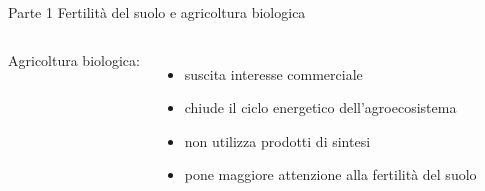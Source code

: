 \documentclass[10pt]{beamer}
\begin{document}
\begin{frame}{Parte 1 \small{Fertilità del suolo e agricoltura biologica}}
  \begin{columns}
    Agricoltura biologica:
    \begin{itemize}[<+->]
    \item suscita interesse commerciale
    \item chiude il ciclo energetico \newline dell'agroecosistema
    \item non utilizza prodotti di sintesi
    \item pone maggiore attenzione alla fertilità del suolo
    \end{itemize}
    
\end{columns}
\end{frame}
\end{document}
